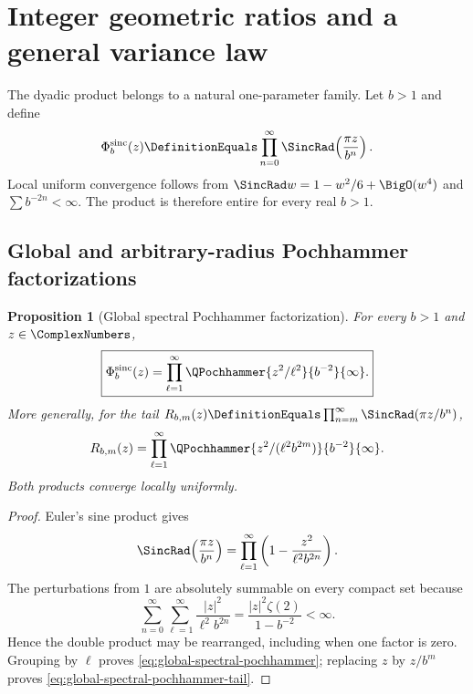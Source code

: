 \documentclass[11pt,oneside]{article}
\numberwithin{equation}{section}
\newtheorem{proposition}[theorem]{Proposition}
\theoremstyle{definition}
\theoremstyle{remark}
\newcommand{\GeometricSincProduct}[1]{\Phi^{\mathrm{sinc}}_{#1}}
\begin{document}
\section{Integer geometric ratios and a general variance law}
\label{sec:integer-ratios}

The dyadic product belongs to a natural one-parameter family.  Let $b>1$ and define
\begin{equation}
 \GeometricSincProduct{b}(z)\DefinitionEquals\prod_{n=0}^{\infty}
 \SincRad\!\left(\frac{\pi z}{b^n}\right).
 \label{eq:Phi-b}
\end{equation}
Local uniform convergence follows from $\SincRad w=1-w^2/6+\BigO(w^4)$ and
$\sum b^{-2n}<\infty$.  The product is therefore entire for every real $b>1$.

\subsection{Global and arbitrary-radius Pochhammer factorizations}

\begin{proposition}[Global spectral Pochhammer factorization]
\label{prop:global-spectral-pochhammer}
For every $b>1$ and $z\in\ComplexNumbers$,
\begin{equation}
 \boxed{\displaystyle
 \GeometricSincProduct{b}(z)=\prod_{\ell=1}^{\infty}
 \QPochhammer{z^2/\ell^2}{b^{-2}}{\infty}.}
 \label{eq:global-spectral-pochhammer}
\end{equation}
More generally, for the tail
$R_{b,m}(z)\DefinitionEquals\prod_{n=m}^{\infty}\SincRad(\pi z/b^n)$,
\begin{equation}
 R_{b,m}(z)=\prod_{\ell=1}^{\infty}
 \QPochhammer{z^2/(\ell^2b^{2m})}{b^{-2}}{\infty}.
 \label{eq:global-spectral-pochhammer-tail}
\end{equation}
Both products converge locally uniformly.
\end{proposition}

\begin{proof}
Euler's sine product gives
\[
 \SincRad\!\left(\frac{\pi z}{b^n}\right)
 =\prod_{\ell=1}^{\infty}
  \left(1-\frac{z^2}{\ell^2b^{2n}}\right).
\]
The perturbations from $1$ are absolutely summable on every compact set because
\[
 \sum_{n=0}^{\infty}\sum_{\ell=1}^{\infty}
 \frac{|z|^2}{\ell^2b^{2n}}
 =\frac{|z|^2\zeta(2)}{1-b^{-2}}<\infty.
\]
Hence the double product may be rearranged, including when one factor is zero.  Grouping by
$\ell$ proves \eqref{eq:global-spectral-pochhammer}; replacing $z$ by $z/b^m$ proves
\eqref{eq:global-spectral-pochhammer-tail}.
\end{proof}
\end{document}
